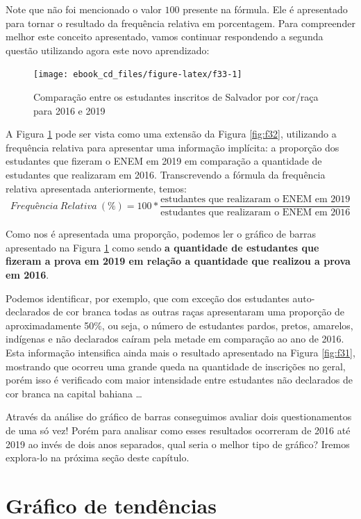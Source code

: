 \documentclass[
  portuguese,
  oneside]{book}
\begin{document}
Note que não foi mencionado o valor \(100\) presente na fórmula. Ele é apresentado para tornar o resultado da frequência relativa em porcentagem. Para compreender melhor este conceito apresentado, vamos continuar respondendo a segunda questão utilizando agora este novo aprendizado:

\begin{figure}

{\centering \texttt{[image: ebook\_cd\_files/figure-latex/f33-1]} 

}

\caption{Comparação entre os estudantes inscritos de Salvador por cor/raça para 2016 e 2019}\label{fig:f33}
\end{figure}

A Figura \ref{fig:f33} pode ser vista como uma extensão da Figura \ref{fig:f32}, utilizando a frequência relativa para apresentar uma informação implícita: a proporção dos estudantes que fizeram o ENEM em 2019 em comparação a quantidade de estudantes que realizaram em 2016. Transcrevendo a fórmula da frequência relativa apresentada anteriormente, temos:
\[Frequência\ Relativa\ (\%) = 100*\frac{\text{estudantes que realizaram o ENEM em 2019}}{\text{estudantes que realizaram o ENEM em 2016}}\]

Como nos é apresentada uma proporção, podemos ler o gráfico de barras apresentado na Figura \ref{fig:f33} como sendo \textbf{a quantidade de estudantes que fizeram a prova em 2019 em relação a quantidade que realizou a prova em 2016}.

Podemos identificar, por exemplo, que com exceção dos estudantes auto-declarados de cor branca todas as outras raças apresentaram uma proporção de aproximadamente 50\%, ou seja, o número de estudantes pardos, pretos, amarelos, indígenas e não declarados caíram pela metade em comparação ao ano de 2016. Esta informação intensifica ainda mais o resultado apresentado na Figura \ref{fig:f31}, mostrando que ocorreu uma grande queda na quantidade de inscrições no geral, porém isso é verificado com maior intensidade entre estudantes não declarados de cor branca na capital bahiana \ldots{}

Através da análise do gráfico de barras conseguimos avaliar dois questionamentos de uma só vez! Porém para analisar como esses resultados ocorreram de 2016 até 2019 ao invés de dois anos separados, qual seria o melhor tipo de gráfico? Iremos explora-lo na próxima seção deste capítulo.

\hypertarget{gtend}{%
\section{Gráfico de tendências}\label{gtend}}
\end{document}
